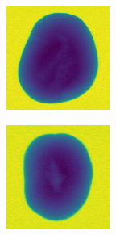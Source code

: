 \documentclass[11pt]{article}
\begin{document}
\begin{figure}[!h]
\begin{subfigure}[b]{0.22\textwidth}
         \caption{}
         \label{fig:hollow_21}
     \end{subfigure}
     \hfill
     \begin{subfigure}[b]{0.22\textwidth}
         \centering
         \includegraphics[width=\textwidth]{figurer/potato_dataset/hollow/hollow_22.jpg}
         \caption{}
         \label{fig:hollow_22}
     \end{subfigure}
     \hfill
     \begin{subfigure}[b]{0.22\textwidth}
         \centering
         \includegraphics[width=\textwidth]{figurer/potato_dataset/hollow/hollow_23.jpg}

\end{subfigure}
\end{figure}
\end{document}
